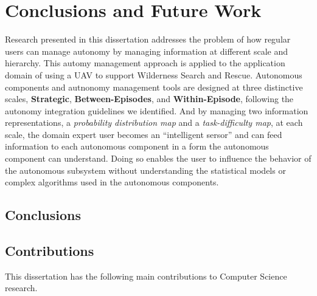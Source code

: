 \chapter[Conclusions and Future Work]{Conclusions and Future Work}
\label{chap:Conclusions}

Research presented in this dissertation addresses the problem of how regular users can manage autonomy by managing information at different scale and hierarchy. This automy management approach is applied to the application domain of using a UAV to support Wilderness Search and Rescue. Autonomous components and autnonomy management tools are designed at three distinctive scales, \textbf{Strategic}, \textbf{Between-Episodes}, and \textbf{Within-Episode}, following the autonomy integration guidelines we identified. And by managing two information representations, a \textit{probability distribution map} and a \textit{task-difficulty map}, at each scale, the domain expert user becomes an ``intelligent sersor'' and can feed information to each autonomous component in a form the autonomous component can understand. Doing so enables the user to influence the behavior of the autonomous subsystem without understanding the statistical models or complex algorithms used in the autonomous components.

\section{Conclusions}
\label{conclusions}




\section{Contributions}
\label{contributions}

This dissertation has the following main contributions to Computer Science research.

